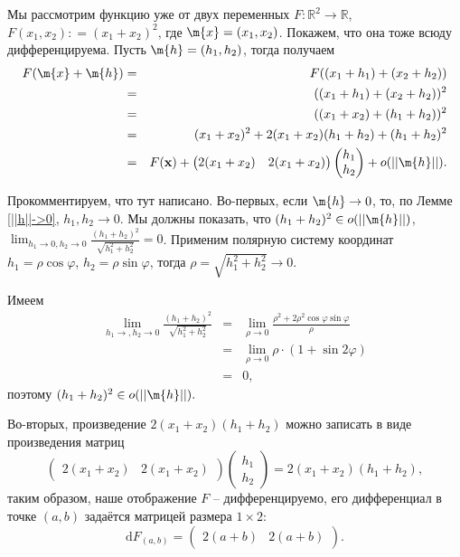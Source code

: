 \begin{example}
Мы рассмотрим функцию уже от двух переменных $F: \mathbb{R}^2 \to \mathbb{R}$, $F(x_1,x_2): = (x_1 + x_2)^2$, где $\m{x} = (x_1, x_2)$. Покажем, что она тоже всюду дифференцируема. Пусть $\m{h}= (h_1,h_2)$, тогда получаем
\begin{eqnarray*}
    F(\m{x} + \m{h}) &=& F((x_1 +h_1) + (x_2 + h_2) ) \\
    &=& ((x_1 +h_1) + (x_2 + h_2) )^2 \\
    &=& ((x_1 + x_2) + (h_1 + h_2))^2 \\
    &=& (x_1 + x_2)^2 + 2(x_1 + x_2)(h_1 + h_2) + (h_1 + h_2)^2 \\
    &=& F(\mathbf{x}) + \begin{pmatrix}
        2(x_1 + x_2) & 2(x_1 + x_2)
    \end{pmatrix} \begin{pmatrix}
        h_1 \\ h_2
    \end{pmatrix} + o(||\m{h}||).
\end{eqnarray*}

Прокомментируем, что тут написано. Во-первых, если $\m{h} \to 0$, то, по Лемме \ref{||h||->0}, $h_1, h_2 \to 0$. Мы должны показать, что $(h_1+h_2)^2 \in o(||\m{h}||)$, \ie $\lim_{h_1 \to 0, h_2 \to 0} \frac{(h_1 + h_2)^2}{\sqrt{h_1^2 + h_2^2}} = 0$. Применим полярную систему координат $h_1 = \rho \cos \varphi$, $h_2 = \rho \sin \varphi$, тогда $\rho = \sqrt{h_1^2 + h_2^2} \to 0$.

Имеем
\begin{eqnarray*}
    \lim_{h_1 \to, h_2 \to 0} \frac{(h_1 + h_2)^2}{\sqrt{h_1^2 + h_2^2}} &=& \lim_{\rho \to 0} \frac{\rho ^2 + 2\rho^2 \cos \varphi \sin \varphi }{\rho} \\
    &=& \lim_{\rho \to 0} \rho \cdot \left(1 + \sin 2\varphi \right) \\
    &=& 0,
\end{eqnarray*}
поэтому $(h_1 + h_2)^2 \in o(||\m{h}||).$

Во-вторых, произведение $2(x_1 + x_2)(h_1 + h_2)$ можно записать в виде произведения матриц
\[
 \begin{pmatrix}
        2(x_1 + x_2) &2(x_1 + x_2)
    \end{pmatrix} \begin{pmatrix}
        h_1 \\ h_2
    \end{pmatrix} = 2(x_1 + x_2)(h_1+h_2),
\]
таким образом, наше отображение $F$ -- дифференцируемо, его дифференциал в точке $(a, b)$ задаётся матрицей размера $1\times 2$:
\[
 \mathrm{d}F_{(a,b)} = \begin{pmatrix}
     2(a+b) & 2(a+b)
 \end{pmatrix}.
\]

\end{example}

